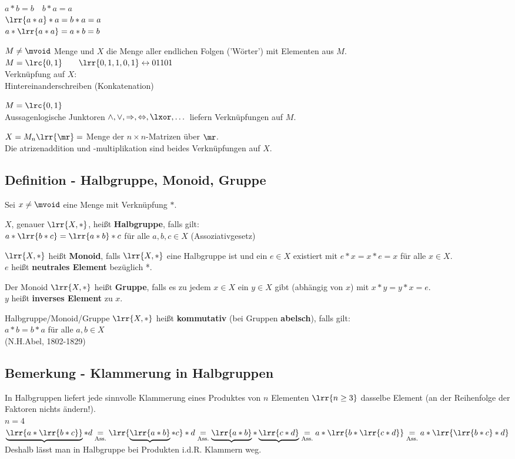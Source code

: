 			$a*b=b\quad b*a=a$\\
			$\lrr{a*a}*a=b*a=a$\\
			$a*\lrr{a*a}=a*b=b$
		\item $M\neq\mvoid$ Menge und $X$ die Menge aller endlichen Folgen ('Wörter') mit Elementen aus $M$.\\
			$M=\lrc{0,1}\qquad\lrr{0,1,1,0,1}\leftrightarrow 01101$\\
			Verknüpfung auf $X$:\\
			Hintereinanderschreiben (Konkatenation)
		\item $M=\lrc{0,1}$\\
			Aussagenlogische Junktoren $\land,\lor,\Rightarrow,\Leftrightarrow,\lxor,\dots$ liefern Verknüpfungen auf $M$.
		\item $X=M_n\lrr{\mr}=$ Menge der $n\times n$-Matrizen über $\mr$.\\
			Die atrizenaddition und -multiplikation sind beides Verknüpfungen auf $X$.
	\subExEnd
\subsection{Definition - Halbgruppe, Monoid, Gruppe}
	Sei $x\neq\mvoid$ eine Menge mit Verknüpfung $*$.
		\item $X$, genauer $\lrr{X,*}$, heißt \textbf{Halbgruppe}, falls gilt: \\
			$a*\lrr{b*c}=\lrr{a*b}*c$ für alle $a,b,c\in X$ (Assoziativgesetz)
		\item $\lrr{X,*}$ heißt \textbf{Monoid}, falls $\lrr{X,*}$ eine Halbgruppe ist und ein $e\in X$ existiert mit $e*x=x*e=x$ für alle $x\in X$. \\
			$e$ heißt \textbf{neutrales Element} bezüglich *.
		\item Der Monoid $\lrr{X,*}$ heißt \textbf{Gruppe}, falls es zu jedem $x\in X$ ein $y\in X$ gibt (abhängig von $x$) mit $x*y=y*x = e$.\\
			$y$ heißt \textbf{inverses Element} zu $x$.
		\item Halbgruppe/Monoid/Gruppe $\lrr{X,*}$ heißt \textbf{kommutativ} (bei Gruppen \textbf{abelsch}), falls gilt:\\
			$a*b=b*a$ für alle $a,b\in X$ \\
			(N.H.Abel, 1802-1829)
	\subExEnd
\subsection{Bemerkung - Klammerung in Halbgruppen}
	In Halbgruppen liefert jede sinnvolle Klammerung eines Produktes von $n$ Elementen $\lrr{n\geq 3}$ dasselbe Element (an der Reihenfolge der Faktoren nichts ändern!).\\
	$n=4$\\
	$\underbrace{\lrr{a*\lrr{b*c}}}*d\underset{\mbox{\scriptsize Ass.}}{=}\lrr{\underbrace{\lrr{a*b}}*c}*d\underset{\mbox{\scriptsize Ass.}}{=}\underbrace{\lrr{a*b}}*\underbrace{\lrr{c*d}}\underset{\mbox{\scriptsize Ass.}}{=}a*\lrr{b*\lrr{c*d}}\underset{\mbox{\scriptsize Ass.}}{=}a*\lrr{\lrr{b*c}*d}$\\
	Deshalb lässt man in Halbgruppe bei Produkten i.d.R. Klammern weg.

